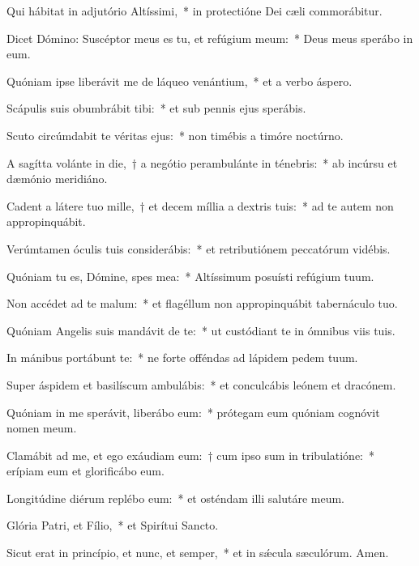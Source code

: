 \item Qui hábitat in adjutório Altíssimi,~* in protectióne Dei cæli commorábitur.

\item Dicet Dómino: Suscéptor meus es tu, et refúgium meum:~* Deus meus sperábo in eum.

\item Quóniam ipse liberávit me de láqueo venántium,~* et a verbo áspero.

\item Scápulis suis obumbrábit tibi:~* et sub pennis ejus sperábis.

\item Scuto circúmdabit te véritas ejus:~* non timébis a timóre noctúrno.

\item A sagítta volánte in die,~† a negótio perambulánte in ténebris:~* ab incúrsu et dæmónio meridiáno.

\item Cadent a látere tuo mille,~† et decem míllia a dextris tuis:~* ad te autem non appropinquábit.

\item Verúmtamen óculis tuis considerábis:~* et retributiónem peccatórum vidébis.

\item Quóniam tu es, Dómine, spes mea:~* Altíssimum posuísti refúgium tuum.

\item Non accédet ad te malum:~* et flagéllum non appropinquábit tabernáculo tuo.

\item Quóniam Angelis suis mandávit de te:~* ut custódiant te in ómnibus viis tuis.

\item In mánibus portábunt te:~* ne forte offéndas ad lápidem pedem tuum.

\item Super áspidem et basilíscum ambulábis:~* et conculcábis leónem et dracónem.

\item Quóniam in me sperávit, liberábo eum:~* prótegam eum quóniam cognóvit nomen meum.

\item Clamábit ad me, et ego exáudiam eum:~† cum ipso sum in tribulatióne:~* erípiam eum et glorificábo eum.

\item Longitúdine diérum replébo eum:~* et osténdam illi salutáre meum.

\item Glória Patri, et Fílio,~* et Spirítui Sancto.

\item Sicut erat in princípio, et nunc, et semper,~* et in sǽcula sæculórum. Amen.

